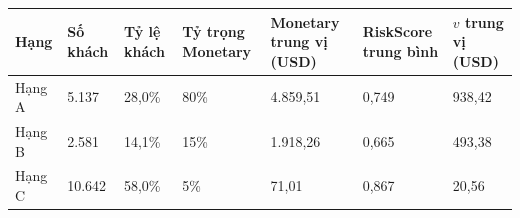 \begin{tabular}{lR{1.5cm}R{1.5cm}R{1.9cm}R{2.2cm}R{2.1cm}R{2.2cm}}
\toprule
Hạng & Số khách & Tỷ lệ khách & Tỷ trọng Monetary & Monetary trung vị (USD) & RiskScore trung bình & $v$ trung vị (USD) \\
\midrule
Hạng A & 5.137 & 28,0\% & 80\% & 4.859,51 & 0,749 & 938,42 \\
Hạng B & 2.581 & 14,1\% & 15\% & 1.918,26 & 0,665 & 493,38 \\
Hạng C & 10.642 & 58,0\% & 5\% & 71,01 & 0,867 & 20,56 \\
\bottomrule
\end{tabular}
